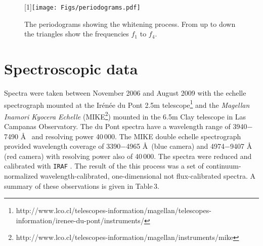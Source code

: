 \documentclass[useAMS,usenatbib]{mn2e}
\begin{document}
\begin{figure*}
\scalebox{1}[1]{\texttt{[image: Figs/periodograms.pdf]}}
\caption{The periodograms showing the whitening process. From up to down the triangles show the frequencies $f_1$ to $f_4$.}
  \label{x}
\end{figure*}





\section{Spectroscopic data}

Spectra were taken between November 2006 and August 2009 with the 
echelle spectrograph mounted at the  Ir\'en\'ee du Pont  2.5m telescope\footnote{http://www.lco.cl/telescopes-information/magellan/telescopes-information/irenee-du-pont/instruments/}  and the {\it Magellan Inamori Kyocera Echelle}
(MIKE\footnote{http://www.lco.cl/telescopes-information/magellan/instruments/mike}) mounted in the 6.5m  Clay telescope 
in Las Campanas Observatory.  
The du Pont spectra have a wavelength range of 3940$-$7490 \AA~
and resolving power 40\,000. The MIKE double echelle spectrograph provided wavelength coverage of
3390$-$4965 \AA~(blue camera) and 4974$-$9407 \AA~ (red camera) 
with resolving power also of 40\,000. 
The spectra were reduced and calibrated with \texttt{IRAF} \citep{1993ASPC...52..173T}. The result of the this process was a set of continuum-normalized wavelength-calibrated, one-dimensional not flux-calibrated spectra. A summary of these observations is given in Table\,3.
\end{document}
